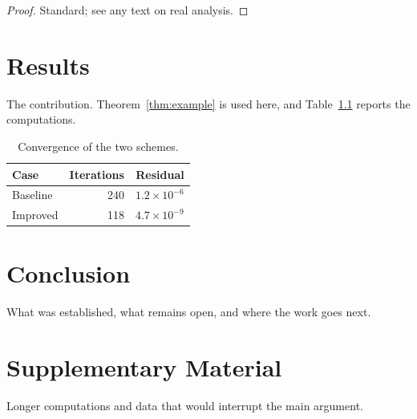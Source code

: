\documentclass[11pt,oneside]{report}
\theoremstyle{plain}
\theoremstyle{definition}
\begin{document}
\begin{proof}
  Standard; see any text on real analysis.
\end{proof}


\chapter{Results}
\label{ch:results}
The contribution. Theorem~\ref{thm:example} is used here, and
Table~\ref{tab:example} reports the computations.

\begin{table}[htbp]
  \centering
  \begin{tabular}{lrr}
    \hline
    Case & Iterations & Residual \\
    \hline
    Baseline & 240 & $1.2\times10^{-6}$ \\
    Improved & 118 & $4.7\times10^{-9}$ \\
    \hline
  \end{tabular}
  \caption{Convergence of the two schemes.}
  \label{tab:example}
\end{table}

\chapter{Conclusion}
\label{ch:conclusion}
What was established, what remains open, and where the work goes next.

\appendix

\chapter{Supplementary Material}
Longer computations and data that would interrupt the main argument.
\end{document}

